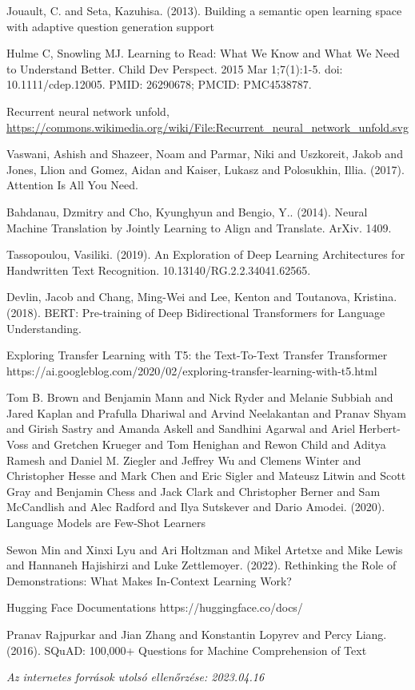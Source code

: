 \documentclass[12pt,a4paper]{report}
\begin{document}
\begin{thebibliography}{100}
 Jouault, C. and Seta, Kazuhisa. (2013). Building a semantic open learning space with adaptive question generation support

 Hulme C, Snowling MJ. Learning to Read: What We Know and What We Need to Understand Better. Child Dev Perspect. 2015 Mar 1;7(1):1-5. doi: 10.1111/cdep.12005. PMID: 26290678; PMCID: PMC4538787.

 Recurrent neural network unfold, \url{https://commons.wikimedia.org/wiki/File:Recurrent\_neural\_network\_unfold.svg}

 Vaswani, Ashish and Shazeer, Noam and Parmar, Niki and Uszkoreit, Jakob and Jones, Llion and Gomez, Aidan and Kaiser, Lukasz and Polosukhin, Illia. (2017). Attention Is All You Need.

 Bahdanau, Dzmitry and Cho, Kyunghyun and Bengio, Y.. (2014). Neural Machine Translation by Jointly Learning to Align and Translate. ArXiv. 1409.

 Tassopoulou, Vasiliki. (2019). An Exploration of Deep Learning Architectures for Handwritten Text Recognition. 10.13140/RG.2.2.34041.62565.

 Devlin, Jacob and Chang, Ming-Wei and Lee, Kenton and Toutanova, Kristina. (2018). BERT: Pre-training of Deep Bidirectional Transformers for Language Understanding.

 Exploring Transfer Learning with T5: the Text-To-Text Transfer Transformer https://ai.googleblog.com/2020/02/exploring-transfer-learning-with-t5.html

 Tom B. Brown and Benjamin Mann and Nick Ryder and Melanie Subbiah and Jared Kaplan and Prafulla Dhariwal and Arvind Neelakantan and Pranav Shyam and Girish Sastry and Amanda Askell and Sandhini Agarwal and Ariel Herbert-Voss and Gretchen Krueger and Tom Henighan and Rewon Child and Aditya Ramesh and Daniel M. Ziegler and Jeffrey Wu and Clemens Winter and Christopher Hesse and Mark Chen and Eric Sigler and Mateusz Litwin and Scott Gray and Benjamin Chess and Jack Clark and Christopher Berner and Sam McCandlish and Alec Radford and Ilya Sutskever and Dario Amodei. (2020). Language Models are Few-Shot Learners

 Sewon Min and Xinxi Lyu and Ari Holtzman and Mikel Artetxe and Mike Lewis and Hannaneh Hajishirzi and Luke Zettlemoyer. (2022). Rethinking the Role of Demonstrations: What Makes In-Context Learning Work?

 Hugging Face Documentations https://huggingface.co/docs/

 Pranav Rajpurkar and Jian Zhang and Konstantin Lopyrev and Percy Liang. (2016). SQuAD: 100,000+ Questions for Machine Comprehension of Text
\end{thebibliography}


\noindent \textit{Az internetes források utolsó ellenőrzése: 2023.04.16}

\pagestyle{empty}

\newpage


\end{document}
